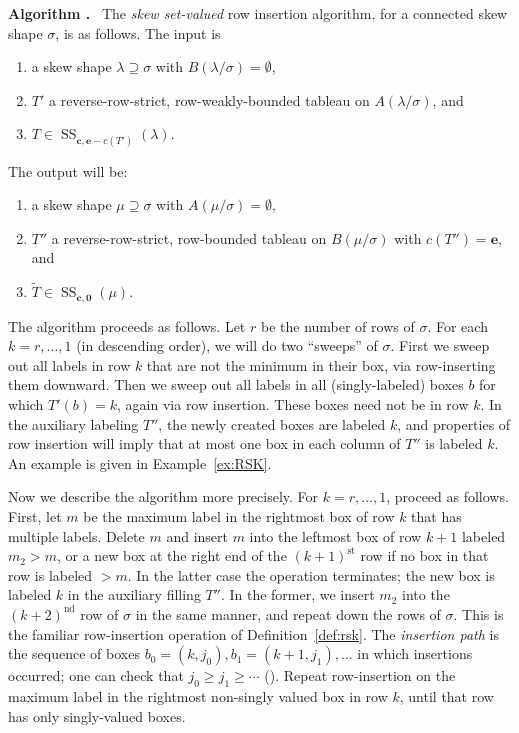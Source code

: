 \documentclass[11pt]{article}
\theoremstyle{definition}
\newenvironment{enonce}[1]{\refstepcounter{theorem}\par\medskip\noindent\textbf{#1 \thetheorem.}\ }{\par\medskip}
\DeclareMathOperator{\Semi}{SS}
\newcommand{\bfc}{\mathbf{c}}
\newcommand{\bfe}{\mathbf{e}}
\newcommand{\bfzr}{\mathbf{0}}
\newcommand{\wt}{\widetilde}
\begin{document}
\begin{enonce}{Algorithm}\label{algorithm}
The \emph{skew set-valued} row insertion algorithm, for a connected skew shape $\sigma$, is as follows. The input is

\begin{enumerate}
\item\label{algo3.12_1_1} a skew shape $\lambda \supseteq \sigma$ with $B(\lambda/\sigma)=\emptyset$,
\item\label{algo3.12_1_2} $T'$ a reverse-row-strict, row-weakly-bounded tableau on $A(\lambda/\sigma)$, and
\item\label{algo3.12_1_3} $T\in \Semi_{\bfc,\bfe-c(T')}(\lambda)$.
\end{enumerate}

The output will be:
\begin{enumerate}
\item\label{algo3.12_2_1} a skew shape $\mu\supseteq \sigma$ with $A(\mu/\sigma)=\emptyset$,
\item\label{algo3.12_2_2} $T''$ a reverse-row-strict, row-bounded tableau on $B(\mu/\sigma)$ with $c(T'')=\bfe$, and
\item\label{algo3.12_2_3} $\wt{T} \in \Semi_{\bfc,\bfzr}(\mu)$.
\end{enumerate}
\end{enonce}

The algorithm proceeds as follows. Let $r$ be the number of rows of $\sigma$. For each $k=r,\ldots,1$ (in descending order), we will do two ``sweeps'' of $\sigma$. First we sweep out all labels in row $k$ that are not the minimum in their box, via row-inserting them downward. Then we sweep out all labels in all (singly-labeled) boxes $b$ for which $T'(b) = k$, again via row insertion. These boxes need not be in row $k$. In the auxiliary labeling $T''$, the newly created boxes are labeled $k$, and properties of row insertion will imply that at most one box in each column of $T''$ is labeled $k$. An example is given in Example~\ref{ex:RSK}. 

Now we describe the algorithm more precisely. For $k=r,\ldots,1$, proceed as follows. First, let $m$ be the maximum label in the rightmost box of row $k$ that has multiple labels. Delete $m$ and insert $m$ into the leftmost box of row $k+1$ labeled $m_2>m$, or a new box at the right end of the $(k+1)^\text{st}$ row if no box in that row is labeled $>m$. In the latter case the operation terminates; the new box is labeled $k$ in the auxiliary filling $T''$. In the former, we insert $m_2$ into the $(k+2)^\text{nd}$ row of $\sigma$ in the same manner, and repeat down the rows of $\sigma$. This is the familiar row-insertion operation of Definition~\ref{def:rsk}. The \emph{insertion path} is the sequence of boxes $b_0 = (k,j_0),b_1=(k\!+\!1,j_1),\ldots$ in which insertions occurred; one can check that $j_0 \ge j_1 \ge \cdots$ (\cite[Lemma~7.11.2]{ec2}). Repeat row-insertion on the maximum label in the rightmost non-singly valued box in row $k$, until that row has only singly-valued boxes. 
\end{document}
